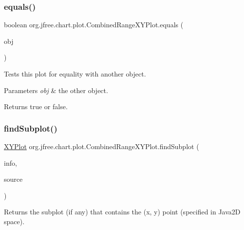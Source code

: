 \subsubsection{\texorpdfstring{equals()}{equals()}}
{\footnotesize\ttfamily boolean org.\+jfree.\+chart.\+plot.\+Combined\+Range\+X\+Y\+Plot.\+equals (\begin{DoxyParamCaption}\item[{Object}]{obj }\end{DoxyParamCaption})}

Tests this plot for equality with another object.


\begin{DoxyParams}{Parameters}
{\em obj} & the other object.\\
\hline
\end{DoxyParams}
\begin{DoxyReturn}{Returns}
{\ttfamily true} or {\ttfamily false}. 
\end{DoxyReturn}
\mbox{\label{classorg_1_1jfree_1_1chart_1_1plot_1_1_combined_range_x_y_plot_abc986774fb1a19f5d9f5320e8dd5a854}} 
\subsubsection{\texorpdfstring{find\+Subplot()}{findSubplot()}}
{\footnotesize\ttfamily \mbox{\hyperlink{classorg_1_1jfree_1_1chart_1_1plot_1_1_x_y_plot}{X\+Y\+Plot}} org.\+jfree.\+chart.\+plot.\+Combined\+Range\+X\+Y\+Plot.\+find\+Subplot (\begin{DoxyParamCaption}\item[{\mbox{\hyperlink{classorg_1_1jfree_1_1chart_1_1plot_1_1_plot_rendering_info}{Plot\+Rendering\+Info}}}]{info,  }\item[{Point2D}]{source }\end{DoxyParamCaption})}

Returns the subplot (if any) that contains the (x, y) point (specified in Java2D space).



